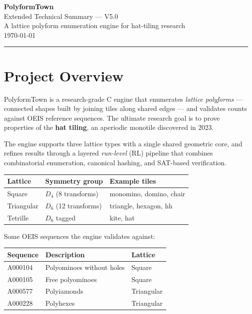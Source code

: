 \documentclass[10pt,a4paper]{article}
\begin{document}
\begin{center}
  {\Huge\bfseries\color{titlecolor} PolyformTown}\\[4pt]
  {\large\color{headercolor} Extended Technical Summary — V5.0}\\[6pt]
  {\small A lattice polyform enumeration engine for hat-tiling research}\\[2pt]
  {\small\color{gray} \today}
\end{center}

\vspace{6pt}
\noindent\rule{\linewidth}{1pt}
\vspace{4pt}

\section{Project Overview}

PolyformTown is a research-grade C engine that enumerates
\emph{lattice polyforms} — connected shapes built by joining tiles
along shared edges — and validates counts against OEIS reference
sequences.  The ultimate research goal is to prove properties of the
\textbf{hat tiling}, an aperiodic monotile discovered in 2023.

The engine supports three lattice types with a single shared geometric
core, and refines results through a layered \emph{run-level} (RL)
pipeline that combines combinatorial enumeration, canonical hashing,
and SAT-based verification.

\vspace{4pt}
\begin{tabular}{@{}lll@{}}
\toprule
\textbf{Lattice} & \textbf{Symmetry group} & \textbf{Example tiles} \\
\midrule
Square      & $D_4$ (8 transforms)  & monomino, domino, chair \\
Triangular  & $D_6$ (12 transforms) & triangle, hexagon, hh   \\
Tetrille    & $D_6$ tagged          & kite, hat               \\
\bottomrule
\end{tabular}

\vspace{6pt}
Some OEIS sequences the engine validates against:

\vspace{2pt}
\begin{tabular}{@{}lll@{}}
\toprule
\textbf{Sequence} & \textbf{Description} & \textbf{Lattice} \\
\midrule
A000104 & Polyominoes without holes & Square \\
A000105 & Free polyominoes          & Square \\
A000577 & Polyiamonds               & Triangular \\
A000228 & Polyhexes                 & Triangular \\
\bottomrule
\end{tabular}
\end{document}
